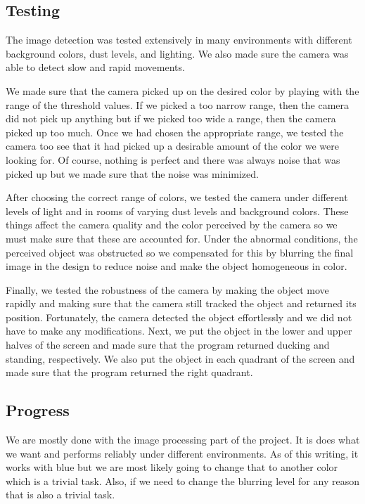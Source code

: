 \documentclass[titlepage, 12pt]{scrartcl}
\begin{document}
    \subsection{Testing}
    The image detection was tested extensively in many environments with different background colors, dust levels, and lighting. We also made sure the camera was able to detect slow and rapid movements.\par 
    We made sure that the camera picked up on the desired color by playing with the range of the threshold values. If we picked a too narrow range, then the camera did not pick up anything but if we picked too wide a range, then the camera picked up too much. Once we had chosen the appropriate range, we tested the camera too see that it had picked up a desirable amount of the color we were looking for. Of course, nothing is perfect and there was always noise that was picked up but we made sure that the noise was minimized. \par
    After choosing the correct range of colors, we tested the camera under different levels of light and in rooms of varying dust levels and background colors. These things affect the camera quality and the color perceived by the camera so we must make sure that these are accounted for. Under the abnormal conditions, the perceived object was obstructed so we compensated for this by blurring the final image in the design to reduce noise and make the object homogeneous in color. \par
    Finally, we tested the robustness of the camera by making the object move rapidly and making sure that the camera still tracked the object and returned its position. Fortunately, the camera detected the object effortlessly and we did not have to make any modifications. Next, we put the object in the lower and upper halves of the screen and made sure that the program returned ducking and standing, respectively. We also put the object in each quadrant of the screen and made sure that the program returned the right quadrant. 
    \subsection{Progress}
    We are mostly done with the image processing part of the project. It is does what we want and performs reliably under different environments. As of this writing, it works with blue but we are most likely going to change that to another color which is a trivial task. Also, if we need to change the blurring level for any reason that is also a trivial task.  
\end{document}
